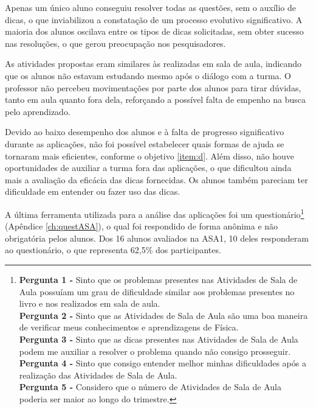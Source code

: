 Apenas um único aluno conseguiu resolver todas as questões, sem o auxílio de dicas, o que inviabilizou a constatação de um processo evolutivo significativo. A maioria dos alunos oscilava entre os tipos de dicas solicitadas, sem obter sucesso nas resoluções, o que gerou preocupação nos pesquisadores. 

As atividades propostas eram similares às realizadas em sala de aula, indicando que os alunos não estavam estudando mesmo após o diálogo com a turma. O professor não percebeu movimentações por parte dos alunos para tirar dúvidas, tanto em aula quanto fora dela, reforçando a possível falta de empenho na busca pelo aprendizado.

Devido ao baixo desempenho dos alunos e à falta de progresso significativo durante as aplicações, não foi possível estabelecer quais formas de ajuda se tornaram mais eficientes, conforme o objetivo \ref{item:d}. Além disso, não houve oportunidades de auxiliar a turma fora das aplicações, o que dificultou ainda mais a avaliação da eficácia das dicas fornecidas. Os alunos também pareciam ter dificuldade em entender ou fazer uso das dicas. 

A última ferramenta utilizada para a análise das aplicações foi um questionário\footnote{\textbf{Pergunta 1 -} Sinto que os problemas presentes nas Atividades de Sala de Aula possuíam um grau de dificuldade similar aos problemas presentes no livro e nos realizados em sala de aula.\\ \textbf{Pergunta 2 -} Sinto que as Atividades de Sala de Aula são uma boa maneira de verificar meus conhecimentos e aprendizagens de Física.\\ \textbf{Pergunta 3 -} Sinto que as dicas presentes nas Atividades de Sala de Aula podem me auxiliar a resolver o problema quando não consigo prosseguir.\\ \textbf{Pergunta 4 -} Sinto que consigo entender melhor minhas dificuldades após a realização das Atividades de Sala de Aula.\\ \textbf{Pergunta 5 -} Considero que o número de Atividades de Sala de Aula poderia ser maior ao longo do trimestre.} (Apêndice \ref{ch:questASA}), o qual foi respondido de forma anônima e não obrigatória pelos alunos. Dos 16 alunos avaliados na ASA1, 10 deles responderam ao questionário, o que representa 62,5\% dos participantes.

